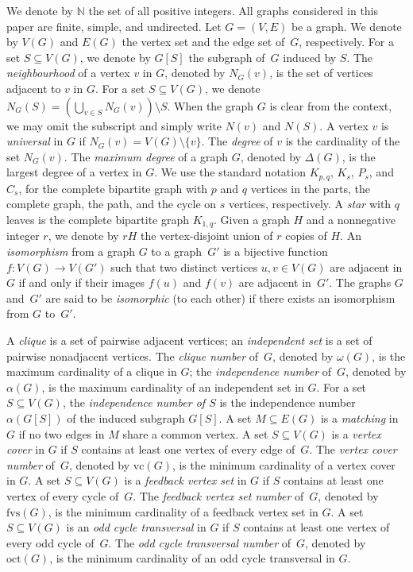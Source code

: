 \documentclass[11pt]{article}
\newcommand{\fvs}{\mathrm{fvs}}
\newcommand{\octt}{\mathrm{oct}}
\newcommand{\vc}{\mathrm{vc}}
\theoremstyle{plain}
\theoremstyle{definition}
\theoremstyle{remark}
\numberwithin{equation}{section}
\begin{document}
We denote by $\mathbb{N}$ the set of all positive integers.
All graphs considered in this paper are finite, simple, and undirected.
Let $G=(V,E)$ be a graph. 
We denote by $V(G)$ and $E(G)$ the vertex set and the edge set of~$G$, respectively. For a set $S \subseteq V(G)$, we denote by $G[S]$ the subgraph of~$G$ induced by $S$.
The \emph{neighbourhood} of a vertex $v$ in $G$, denoted by $N_G(v)$, is the set of vertices adjacent to $v$ in $G$. 
For a set $S \subseteq V(G)$, we denote $N_G(S) = (\bigcup_{v \in S} N_G(v)) \setminus S$. 
When the graph $G$ is clear from the context, we may omit the subscript and simply write $N(v)$ and $N(S)$.
A vertex $v$ is \emph{universal} in $G$ if $N_G(v) = V(G) \setminus \{v\}$. 
The \emph{degree} of $v$ is the cardinality of the set $N_G(v)$. 
The \emph{maximum degree} of a graph $G$, denoted by $\Delta(G)$, is the largest degree of a vertex in $G$. 
We use the standard notation $K_{p,q}$, $K_s$, $P_s$, and $C_s$, for the complete bipartite graph with $p$ and $q$ vertices in the parts, the complete graph, the path, and the cycle on $s$ vertices, respectively. 
A \emph{star} with $q$ leaves is the complete bipartite graph $K_{1,q}$.
Given a graph $H$ and a nonnegative integer $r$, we denote by $rH$ the vertex-disjoint union of $r$ copies of $H$.
An \emph{isomorphism} from a graph $G$ to a graph~$G'$ is a bijective function $f:V(G)\to V(G')$ such that two distinct vertices $u,v\in V(G)$ are adjacent in $G$ if and only if their images $f(u)$ and $f(v)$ are adjacent in~$G'$.
The graphs $G$ and~$G'$ are said to be \emph{isomorphic} (to each other) if there exists an isomorphism from $G$ to~$G'$.

A \emph{clique} is a set of pairwise adjacent vertices; an \emph{independent set} is a set of pairwise nonadjacent vertices.
The \emph{clique number} of~$G$, denoted by $\omega(G)$, is the maximum cardinality of a clique in $G$;
the \emph{independence number} of~$G$, denoted by $\alpha(G)$, is the maximum cardinality of an independent set in $G$.
For a set $S \subseteq V(G)$, the \emph{independence number of $S$} is the independence number $\alpha(G[S])$ of the induced subgraph $G[S]$.
A set $M\subseteq E(G)$ is a \emph{matching} in $G$ if no two edges in $M$ share a common vertex. 
A set $S\subseteq V(G)$ is a \emph{vertex cover} in $G$ if $S$ contains at least one vertex of every edge of~$G$. 
The \emph{vertex cover number} of~$G$, denoted by $\vc(G)$, is the minimum cardinality of a vertex cover in  $G$.
A set $S\subseteq V(G)$ is a \emph{feedback vertex set} in $G$ if $S$ contains at least one vertex of every cycle of~$G$. 
The \emph{feedback vertex set number} of~$G$, denoted by $\fvs(G)$, is the minimum cardinality of a feedback vertex set in $G$.
A set $S\subseteq V(G)$ is an \emph{odd cycle transversal} in $G$ if $S$ contains at least one vertex of every odd cycle of~$G$. 
The \emph{odd cycle transversal number} of~$G$, denoted by $\octt(G)$, is the minimum cardinality of an odd cycle transversal in $G$.
\end{document}
